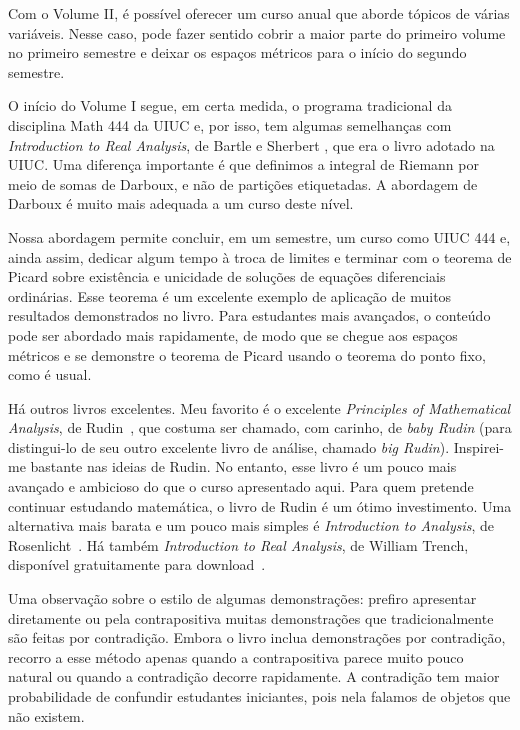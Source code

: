Com o Volume II\@, é possível oferecer um curso anual que aborde tópicos de
várias variáveis. Nesse caso, pode fazer sentido cobrir a maior parte do
primeiro volume no primeiro semestre e deixar os espaços métricos para o
início do segundo semestre.

O início do Volume I segue, em certa medida, o programa tradicional da
disciplina Math 444 da UIUC e, por isso, tem algumas semelhanças com
\emph{Introduction to Real Analysis}, de Bartle e Sherbert \cite{BS}, que era
o livro adotado na UIUC\@.
Uma diferença importante é que definimos a integral de Riemann por meio de
somas de Darboux, e não de partições etiquetadas. A abordagem de Darboux é muito
mais adequada a um curso deste nível.

Nossa abordagem permite concluir, em um semestre, um curso como UIUC 444 e,
ainda assim, dedicar algum tempo à troca de limites e terminar com o teorema
de Picard sobre existência e unicidade de soluções de equações diferenciais
ordinárias.
Esse teorema é um excelente exemplo de aplicação de muitos resultados
demonstrados no livro. Para estudantes mais avançados, o conteúdo pode ser
abordado mais rapidamente, de modo que se chegue aos espaços métricos e se
demonstre o teorema de Picard usando o teorema do ponto fixo, como é usual.

Há outros livros excelentes. Meu favorito é o excelente
\emph{Principles of Mathematical Analysis}, de Rudin~\cite{Rudin:baby},
que costuma ser chamado, com carinho, de \emph{baby Rudin} (para distingui-lo de seu outro
excelente livro de análise, chamado \emph{big Rudin}). Inspirei-me bastante
nas ideias de Rudin. No entanto, esse livro é um pouco mais avançado e
ambicioso do que o curso apresentado aqui.
Para quem pretende continuar estudando matemática, o livro de Rudin é um
ótimo investimento. Uma alternativa mais barata e um pouco mais simples é
\emph{Introduction to Analysis}, de Rosenlicht~\cite{Rosenlicht}.
Há também \emph{Introduction to Real Analysis}, de William Trench, disponível
gratuitamente para download~\cite{Trench}.

\medskip

Uma observação sobre o estilo de algumas demonstrações: prefiro apresentar
diretamente ou pela contrapositiva muitas demonstrações que tradicionalmente
são feitas por contradição. Embora o livro inclua demonstrações por
contradição, recorro a esse método apenas quando a contrapositiva parece
muito pouco natural ou quando a contradição decorre rapidamente.
A contradição tem maior probabilidade de confundir estudantes iniciantes,
pois nela falamos de objetos que não existem.

